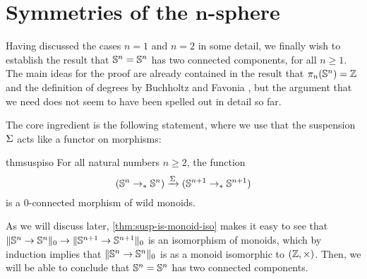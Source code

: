 \documentclass[english,a4paper]{lmcs}
\begin{document}
\section{Symmetries of the \texorpdfstring{$\boldsymbol n$}{n}-sphere}
\label{sec:higher-sphere}



Having discussed the cases $n = 1$ and $n = 2$ in some detail, we finally wish to establish the result that ${\mathbb S^{n}} = {\mathbb S^{n}}$ has two connected components, for all $n \geq 1$.
The main ideas for the proof are already contained in the result that $\pi_n({\mathbb S^{n}}) = \mathbb{Z}$ \cite{licataBrunerie_s1again} and the definition of degrees by Buchholtz and Favonia \cite{Buchholtz2018CellularCI}, but the argument that we need does not seem to have been spelled out in detail so far.

The core ingredient is the following statement,
where we use that the suspension $\operatorname{\Sigma}$ acts like a functor on morphisms:
\begin{restatable}{thm}{suspiso}
    \label{thm:susp-is-monoid-iso}
    For all natural numbers $n \geq 2$, the function
    \begin{equation} \label{eq:susp-monoid-morphism}
    ({\mathbb S^{n}} \to_* {\mathbb S^{n}}) \xrightarrow{\operatorname{\Sigma}} ({\mathbb S^{n+1}} \to_* {\mathbb S^{n+1}})
    \end{equation}
    is a $0$-connected morphism of wild monoids.
\end{restatable}

As we will discuss later, \cref{thm:susp-is-monoid-iso} makes it easy to see
that $\lVert{\mathbb S^{n}} \to {\mathbb S^{n}}\rVert_0 \to \lVert{\mathbb S^{n+1}} \to {\mathbb S^{n+1}}\rVert_0$ is
an isomorphism of monoids, which by induction implies that $\lVert{\mathbb S^{n}}
\to {\mathbb S^{n}}\rVert_0$ is as a monoid isomorphic to $(\mathbb{Z}, \times)$. Then, we will be able
to conclude that ${\mathbb S^{n}} = {\mathbb S^{n}}$ has two connected components.
\end{document}
